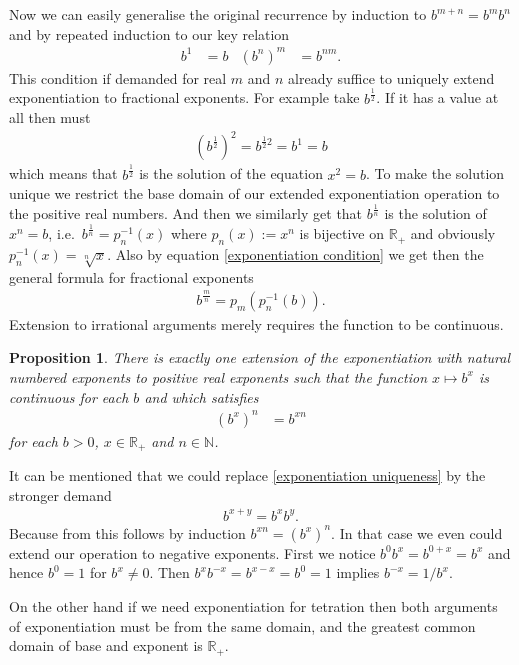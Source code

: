 \documentclass[12pt]{article}
\newtheorem{proposition}{Proposition}
\theoremstyle{definition}
\newcommand{\N}{\mathbb{N}}
\newcommand{\RP}{\mathbb{R}_+}
\begin{document}
Now we can easily generalise the original recurrence by induction to
$b^{m+n}=b^mb^n$ and by repeated induction to our key relation
\begin{align}
  b^1&=b & (b^n)^m&=b^{nm}.\label{exponentiation condition}
\end{align}
This condition if demanded for real $m$ and $n$ already suffice to
uniquely extend exponentiation to fractional exponents. For example
take $b^{\frac{1}{2}}$. If it has a value at all then must
\begin{align*}
  (b^{\frac{1}{2}})^2 = b^{\frac{1}{2}2} = b^1 = b
\end{align*}
which means that $b^{\frac{1}{2}}$ is the solution of the equation
$x^2=b$. To make the solution unique we restrict the base domain of
our extended exponentiation operation to the positive real
numbers. And then we similarly get that $b^{\frac{1}{n}}$ is the
solution of $x^n=b$, i.e.\ $b^{\frac{1}{n}}=p_n^{-1}(x)$ where
$p_n(x):=x^n$ is bijective on $\RP$ and obviously
$p_n^{-1}(x)=\sqrt[n]{x}$. Also by equation
\eqref{exponentiation condition} we get then the general formula for
fractional exponents
\begin{align*}
  b^{\frac{m}{n}}=p_m(p_n^{-1}(b)).
\end{align*}
Extension to irrational arguments merely requires the function to be
continuous.
\begin{proposition}
  There is exactly one extension of the exponentiation with natural
  numbered exponents to positive real exponents
  such that the function $x\mapsto b^x$ is continuous for each $b$ and
  which satisfies 
  \begin{align}
    (b^x)^ n &= b^{xn}\label{exponentiation uniqueness}
  \end{align}
  for each $b>0$, $x\in\RP$ and $n\in\N$. 
\end{proposition}
It can be mentioned that we could replace \eqref{exponentiation
  uniqueness} by the stronger demand 
\begin{align}
  b^{x+y}=b^xb^y.\label{exponentiation additivity}
\end{align}
 Because from
this follows by induction $b^{xn}=(b^x)^n$. In that case
  we even could extend our operation to negative exponents. First we
  notice $b^{0}b^x=b^{0+x}=b^x$ and hence $b^0=1$ for $b^x\neq
  0$. Then $b^{x}b^{-x}=b^{x-x}=b^0=1$ implies $b^{-x}=1/b^{x}$.
  
  On the other hand if we need exponentiation for tetration then both
  arguments of exponentiation must be from the same domain, and the
  greatest common domain of base and exponent is $\RP$.
\end{document}
